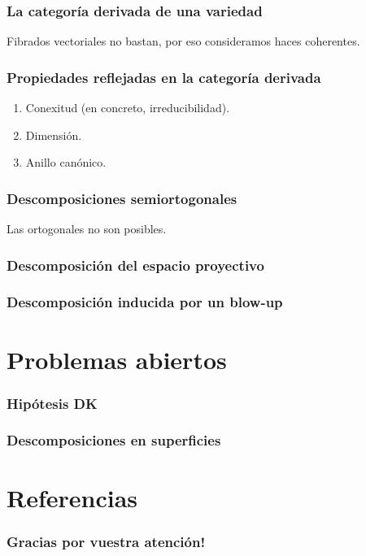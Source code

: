 \documentclass[12pt]{beamer}
\begin{document}
\begin{frame}
  \frametitle{La categoría derivada de una variedad}
  Fibrados vectoriales no bastan, por eso consideramos haces coherentes.
\end{frame}

\begin{frame}
  \frametitle{Propiedades reflejadas en la categoría derivada}
  \begin{enumerate}
    \item Conexitud (en concreto, irreducibilidad).
    \item Dimensión.
    \item Anillo canónico.
  \end{enumerate}
\end{frame}

\begin{frame}
  \frametitle{Descomposiciones semiortogonales}
  Las ortogonales no son posibles.
\end{frame}

\begin{frame}
  \frametitle{Descomposición del espacio proyectivo}
\end{frame}

\begin{frame}
  \frametitle{Descomposición inducida por un blow-up}
\end{frame}

\section{Problemas abiertos}

\begin{frame}
  \frametitle{Hipótesis DK}
\end{frame}

\begin{frame}
  \frametitle{Descomposiciones en superficies}
\end{frame}

\section{Referencias}

\begin{frame}
  \frametitle{Gracias por vuestra atención!}
  \nocite{gm03}
  \nocite{huy06}
  \nocite{kaw17}
  \nocite{mat02}
  \printbibliography[heading=none]
\end{frame}
\end{document}
